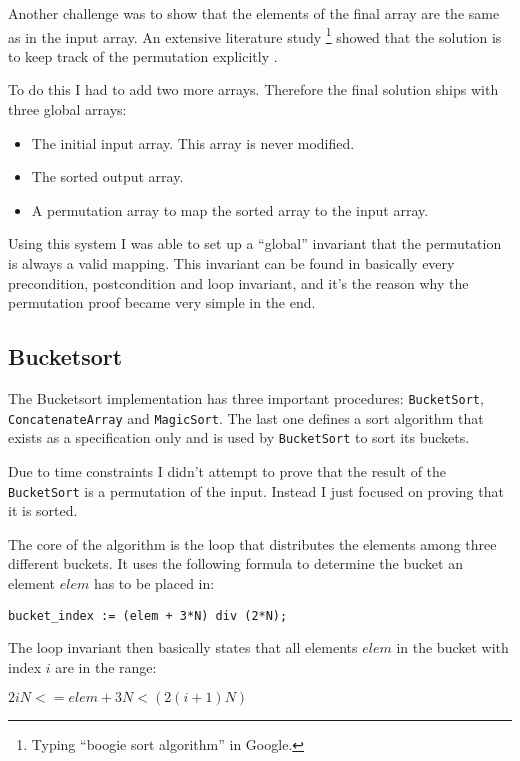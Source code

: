 \documentclass[a4paper,10pt]{article}
\begin{document}
Another challenge was to show that the elements of the final array are the same as in the input array.
An extensive literature study \footnote{Typing ``boogie sort algorithm'' in Google.} showed that the solution is to 
keep track of the permutation explicitly \cite{web:boogie:bubblesort}.

To do this I had to add two more arrays.
Therefore the final solution ships with three global arrays:
\begin{itemize}
 \item The initial input array. This array is never modified.
 \item The sorted output array.
 \item A permutation array to map the sorted array to the input array.
\end{itemize}

Using this system I was able to set up a ``global'' invariant that the permutation is always a valid mapping.
This invariant can be found in basically every precondition, postcondition and loop invariant, and it's the reason why the permutation proof became very simple in the end.

\subsection{Bucketsort}

The Bucketsort implementation has three important procedures: \lstinline!BucketSort!, \lstinline!ConcatenateArray! and \lstinline!MagicSort!.
The last one defines a sort algorithm that exists as a specification only and is used by \lstinline!BucketSort! to sort its buckets.

Due to time constraints I didn't attempt to prove that the result of the \lstinline!BucketSort! is a permutation of the input.
Instead I just focused on proving that it is sorted.

The core of the algorithm is the loop that distributes the elements among three different buckets.
It uses the following formula to determine the bucket an element $elem$ has to be placed in:

\begin {center}
\lstinline!bucket_index := (elem + 3*N) div (2*N);!
\end {center}

The loop invariant then basically states that all elements $elem$ in the bucket with index $i$ are in the range:
\begin {center}
$2iN <= elem + 3N < (2(i+1)N)$
\end {center}
\end{document}
